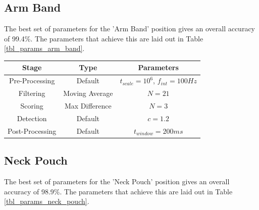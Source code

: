             \subsection{Arm Band}

                The best set of parameters for the 'Arm Band' position gives an overall accuracy of 99.4\%. The parameters that achieve this are laid out in Table \ref{tbl_params_arm_band}.

                \begin{center}
                    \label{tbl_params_arm_band}
                    \begin{tabular}{|c|c|c|}
                        \hline
                        Stage & Type & Parameters \\
                        \hline
                        Pre-Processing & Default & $t_{scale}=10^6$, $f_{int}=100Hz$ \\
                        Filtering & Moving Average & $N=21$ \\
                        Scoring & Max Difference & $N=3$ \\
                        Detection & Default & $c=1.2$ \\
                        Post-Processing & Default & $t_{window}=200ms$ \\
                        \hline
                    \end{tabular}
                \end{center}

            \subsection{Neck Pouch}

                The best set of parameters for the 'Neck Pouch' position gives an overall accuracy of 98.9\%. The parameters that achieve this are laid out in Table \ref{tbl_params_neck_pouch}.

